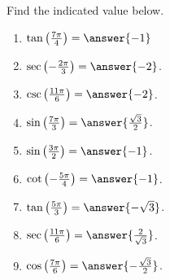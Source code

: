 \documentclass{ximera}
\author{Kenneth Berglund}
\begin{document}
\begin{exercise}
Find the indicated value below.

\begin{enumerate}
\item $\tan\left(\frac{7\pi}{4}\right) = \answer{-1}$

\item $\sec\left(-\frac{2\pi}{3}\right) = \answer{-2}$.

\item $\csc\left(\frac{11\pi}{6}\right) = \answer{-2}$.

\item $\sin\left(\frac{7\pi}{3}\right) = \answer{\frac{\sqrt{3}}{2}}$.

\item $\sin\left(\frac{3\pi}{2}\right) = \answer{-1}$.

\item $\cot\left(-\frac{5\pi}{4}\right) = \answer{-1}$.

\item $\tan\left(\frac{5\pi}{3}\right) = \answer{-\sqrt{3}}$.

\item $\sec\left(\frac{11\pi}{6}\right) = \answer{\frac{2}{\sqrt{3}}}$.

\item $\cos\left(\frac{7\pi}{6}\right) = \answer{-\frac{\sqrt{3}}{2}}$.
\end{enumerate}

\end{exercise}
\end{document}
